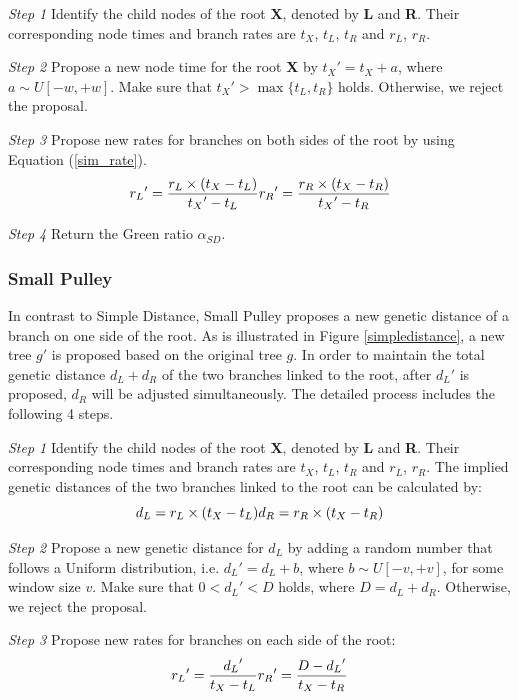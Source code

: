 \documentclass{bmcart}
\begin{document}
\emph{Step 1} Identify the child nodes of the root \textbf{X}, denoted by \textbf{L} and \textbf{R}. Their corresponding node times and branch rates are $t_X$, $t_L$, $t_R$ and $r_L$, $r_R$.

\emph{Step 2} Propose a new node time for the root \textbf{X} by ${t_X}' = {t_X} + a$, where $a \sim U[ - w, + w]$. Make sure that ${t_X}' > \max \{ {t_L}, {t_R}\} $ holds. Otherwise, we reject the proposal.

\emph{Step 3} Propose new rates for branches on both sides of the root by using Equation (\ref{sim_rate}).
\begin{equation}
\label{sim_rate}
{r_L}' = \frac{{{r_L} \times ({{t_X} - {t_L}})}}{{{t_X}' - {t_L}}}\\
{r_R}' = \frac{{{r_R} \times ({{t_X} - {t_R}})}}{{{t_X}' - {t_R}}}
 \end{equation}

\emph{Step 4} Return the Green ratio ${\alpha_{SD}}$.
\subsubsection*{Small Pulley}
In contrast to Simple Distance, Small Pulley proposes a new genetic distance of a branch on one side of the root. As is illustrated in Figure \ref{simpledistance}, a new tree ${g}'$ is proposed based on the original tree $g$. In order to maintain the total genetic distance $d_L + d_R$ of the two branches linked to the root, after ${d_L}'$ is proposed, $d_R$ will be adjusted simultaneously. The detailed process includes the following 4 steps.

\emph{Step 1} Identify the child nodes of the root \textbf{X}, denoted by \textbf{L} and \textbf{R}. Their corresponding node times and branch rates are $t_X$, $t_L$, $t_R$ and $r_L$, $r_R$. The implied genetic distances of the two branches linked to the root can be calculated by:
\begin{equation}
\label{sma1_dis}
{d_L} = {r_L} \times ({{t_X} - {t_L}})\\
{d_R} = {r_R} \times ({{t_X} - {t_R}})
 \end{equation}

\emph{Step 2} Propose a new genetic distance for $d_L$ by adding a random number that follows a Uniform distribution, i.e.  ${d_L}' = {d_L} + b$, where $b \sim U[ - v, + v]$, for some window size $v$. Make sure that $0 < {d_L}' < D$ holds, where $D = {d_L} + {d_R}$. Otherwise, we reject the proposal.

\emph{Step 3} Propose new rates for branches on each side of the root:
\begin{equation}
\label{sma1_rate}
{r_L}' = \frac{{{d_L}'}}{{{t_X} - {t_L}}}\\
{r_R}' = \frac{{D - {d_L}'}}{{{t_X} - {t_R}}}
 \end{equation}
\end{document}

